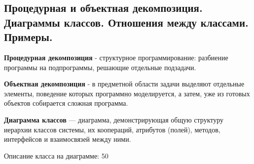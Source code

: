 
\newpage\subsection{Процедурная и объектная декомпозиция. Диаграммы классов. Отношения между классами. Примеры. }

\begin{myquote}
            
\end{myquote}

{\bf {Процедурная декомпозиция}} - структурное программирование: разбиение программы на подпрограммы, решающие отдельные подзадачи.

{\bf {Объектная декомпозиция}} - в предметной области задачи выделяют отдельные элементы, поведение которых программно моделируется, а затем, уже из готовых объектов собирается сложная программа.

{\bf {Диаграмма классов}} — диаграмма, демонстрирующая общую структуру иерархии классов системы, их коопераций, атрибутов (полей), методов, интерфейсов и взаимосвязей между ними.

\noindent
Описание класса на диаграмме:
 {50}

